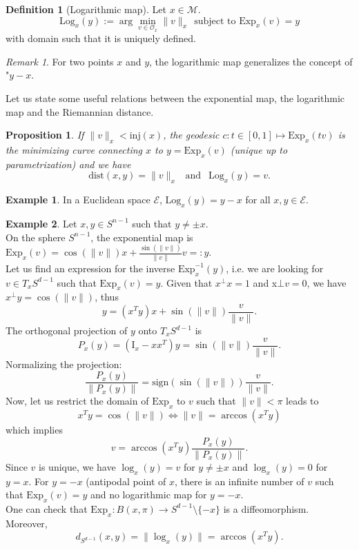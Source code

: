 \documentclass[10pt,a4paper]{book}
\theoremstyle{definition}
\newtheorem{defn}{Definition}[section]
\newtheorem{exm}{Example}[section]
\theoremstyle{plain}
\newtheorem{prop}{Proposition}[section]
\theoremstyle{remark}
\newtheorem{rmk}{Remark}[section]
\newcommand{\E}{\mathcal{E}}
\newcommand \M {\mathcal{M}}
\begin{document}
\begin{defn}[Logarithmic map]
Let $x\in \M$. 
$$\text{Log}_x(y):=\arg \min_{v\in \mathcal{O}_x}\|v\|_x~~\text{subject to }\text{Exp}_x(v)=y$$
with domain such that it is uniquely defined.
\end{defn}
\begin{rmk}
For two points $x$ and $y$, the logarithmic map generalizes the concept of "$y-x$.
\end{rmk}
Let us state some useful relations between the exponential map, the logarithmic map and the Riemannian distance.
\begin{prop}
If $\|v\|_x<\text{inj}(x)$, the geodesic $c: t\in [0,1] \mapsto \text{Exp}_x(tv)$ is the minimizing curve connecting $x$ to $y=\text{Exp}_x(v)$ (unique up to parametrization) and we have
$$\text{dist}(x,y)=\|v\|_x~~\text{ and }~~\text{Log}_x(y)=v.$$
\end{prop}
\begin{exm}
In a Euclidean space $\E$, $\text{Log}_x(y)=y-x$ for all $x,y\in \E$.
\end{exm}
\begin{exm}Let $x,y\in S^{n-1}$ such that $y\neq \pm x$. \\
On the sphere $S^{n-1}$, the exponential map is $\text{Exp}_x(v)=\cos(\|v\|)x+\frac{\sin(\|v\|)}{\|v\|}v=:y$. \\
 Let us find an expression for the inverse $\text{Exp}_x^{-1}(y)$, i.e. we are looking for $v\in T_xS^{d-1}$ such that $\text{Exp}_x(v)=y$. Given that $x^{\bot}x=1$ and x${\bot}v=0$, we have $x^{\bot}y=\cos(\|v\|)$, thus
 $$y=(x^Ty)x+\sin(\|v\|)\frac{v}{\|v\|}.$$ 
The orthogonal projection of $y$ onto $T_xS^{d-1}$ is
$$P_x(y)=(\text{I}_x-xx^{T})y=\sin(\|v\|)\frac{v}{\|v\|}.$$
Normalizing the projection:
$$\frac{P_x(y)}{\|P_x(y)\|}=\text{sign}(\sin(\|v\|))\frac{v}{\|v\|}.$$
Now, let us restrict the domain of $\text{Exp}_x$ to $v$ such that $\|v\|<\pi$ leads to 
$$x^Ty=\cos(\|v\|) \iff \|v\|=\arccos(x^Ty)$$
which implies
$$v=\arccos(x^Ty)\frac{P_x(y)}{\|P_x(y)\|}.$$
Since $v$ is unique, we have $\log_x(y)=v$ for $y\neq \pm x$ and $\log_x(y)=0$ for $y=x$. For $y=-x$ (antipodal point of $x$, there is an infinite number of $v$ such that $\text{Exp}_x(v)=y$ and no logarithmic map for $y=-x$. \\ One can check that $\text{Exp}_x:B(x,\pi)\to S^{d-1}\setminus \{-x\}$ is a diffeomorphism. Moreover,
$$d_{S^{d-1}}(x,y)=\|\log_x(y)\|=\arccos(x^Ty).$$


\end{exm}
\end{document}
